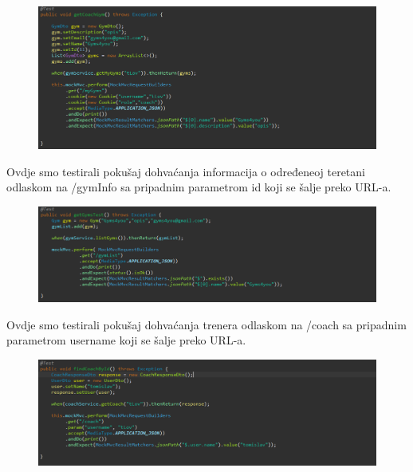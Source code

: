 			\begin{figure}[H]
    			\hspace*{-1.5cm}
    			\includegraphics[scale=0.5]{slike/getCoachGym.PNG} %
    			\centering
    			\label{fig:promjene}
    	    \end{figure}
	
				
			\noindent {}
			
			Ovdje smo testirali pokušaj dohvaćanja informacija o određeneoj teretani odlaskom na /gymInfo sa pripadnim parametrom id koji se šalje preko URL-a.
             
			\begin{figure}[H]
    			\hspace*{-1.5cm}
    			\includegraphics[scale=0.5]{slike/getGyms.PNG} %
    			\centering
    			\label{fig:promjene}
    	    \end{figure}
	

			\noindent {}
			
			Ovdje smo testirali pokušaj dohvaćanja trenera odlaskom na /coach sa pripadnim parametrom username koji se šalje preko URL-a.

			\begin{figure}[H]
    			\hspace*{-1.5cm}
    			\includegraphics[scale=0.5]{slike/findCoachBy.PNG} %
    			\centering
    			\label{fig:promjene}
    	    \end{figure}
	

